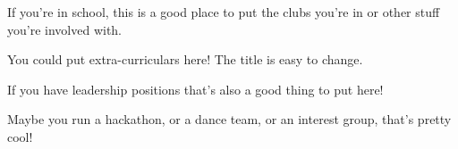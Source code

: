 
\begin{tightemize}
\item If you're in school, this is a good place to put the clubs you're in or other stuff you're involved with.
\item You could put extra-curriculars here! The title is easy to change.
\end{tightemize}
\subsectionsep

\begin{tightemize}
\item If you have leadership positions that's also a good thing to put here!
\item Maybe you run a hackathon, or a dance team, or an interest group, that's pretty cool!
\end{tightemize}
